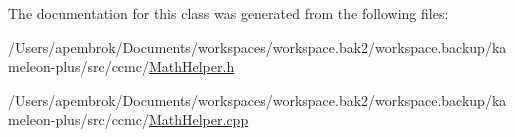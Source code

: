 The documentation for this class was generated from the following files\-:\begin{DoxyCompactItemize}
\item 
/\-Users/apembrok/\-Documents/workspaces/workspace.\-bak2/workspace.\-backup/kameleon-\/plus/src/ccmc/\hyperlink{_math_helper_8h}{Math\-Helper.\-h}\item 
/\-Users/apembrok/\-Documents/workspaces/workspace.\-bak2/workspace.\-backup/kameleon-\/plus/src/ccmc/\hyperlink{_math_helper_8cpp}{Math\-Helper.\-cpp}\end{DoxyCompactItemize}
